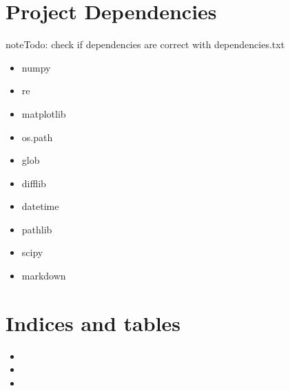 \documentclass[letterpaper,10pt,english]{sphinxmanual}
\begin{document}
\chapter{Project Dependencies}
\label{\detokenize{index:project-dependencies}}
\begin{sphinxadmonition}{note}{\label{index:index-0}Todo:}
check if dependencies are correct with dependencies.txt
\end{sphinxadmonition}
\begin{itemize}
\item {} 
numpy

\item {} 
re

\item {} 
matplotlib

\item {} 
os.path

\item {} 
glob

\item {} 
difflib

\item {} 
datetime

\item {} 
pathlib

\item {} 
scipy

\item {} 
markdown

\end{itemize}


\chapter{Indices and tables}
\label{\detokenize{index:indices-and-tables}}\begin{itemize}
\item {} 

\item {} 

\item {} 

\end{itemize}


\renewcommand{\indexname}{Python Module Index}
\begin{sphinxtheindex}
\let\bigletter\sphinxstyleindexlettergroup
\bigletter{f}
\item\relax{}
\indexspace
\bigletter{m}
\item\relax{}
\indexspace
\bigletter{p}
\item\relax{}
\end{sphinxtheindex}

\renewcommand{\indexname}{Index}
\printindex
\end{document}
